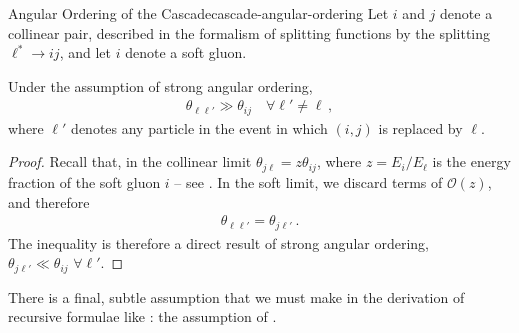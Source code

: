 \begin{lemma}{Angular Ordering of the Cascade}{cascade-angular-ordering}
    Let \(i\) and \(j\) denote a collinear pair, described in the formalism of splitting functions by the splitting \(\ell^* \to i j\), and let \(i\) denote a soft gluon.

    Under the assumption of strong angular ordering,
    \begin{align}
        \theta_{\ell \ell'} \gg \theta_{ij}
        \quad
        \forall \ell' \neq \ell
        \,,
    \end{align}
    where \(\ell'\) denotes any particle in the event in which \((i,j)\) is replaced by \(\ell\).
\end{lemma}

\begin{proof}
    Recall that, in the collinear limit \(\theta_{j \ell} = z \theta_{ij}\), where \(z = E_i / E_\ell\) is the energy fraction of the soft gluon \(i\) -- see .
    In the soft limit, we discard terms of \(\mathcal{O}(z)\), and therefore
    \begin{align}
        \theta_{\ell \ell'} = \theta_{j \ell'}
        \,.
    \end{align}
    The inequality is therefore a direct result of strong angular ordering, \(\theta_{j \ell'} \ll \theta_{ij} \,\, \forall \ell'\).
\end{proof}



There is a final, subtle assumption that we must make in the derivation of recursive formulae like :
%
the assumption of .

